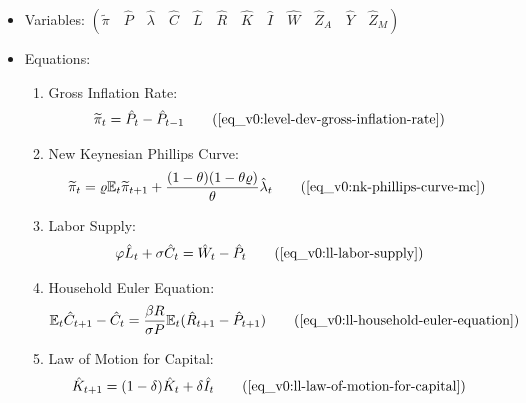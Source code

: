 \documentclass[../thesis.tex]{subfiles}
\begin{document}
	{\singlespacing
		
		\begin{itemize}
			
			\item Variables: \( \left( \tilde{\pi} \quad \hat{P} \quad \hat{\lambda} \quad \hat{C} \quad \hat{L} \quad \hat{R} \quad \hat{K} \quad \hat{I} \quad \hat{W} \quad \hat{Z}_A \quad \hat{Y} \quad \hat{Z}_M \right) \)
			
			\item Equations:
			
			\begin{enumerate}
				
				\item Gross Inflation Rate:
				\begin{align}
					\widetilde{\pi}_t &= \hat{P}_t - \hat{P}_{t-1}
					\tag{\ref{eq_v0:level-dev-gross-inflation-rate}}
				\end{align}
				
				\item New Keynesian Phillips Curve:
				\begin{align}
					\widetilde{\pi}_t = \varrho \E \widetilde{\pi}_{t+1} + \frac{(1-\theta) (1- \theta \varrho)}{\theta} \hat{\lambda}_t
					\tag{\ref{eq_v0:nk-phillips-curve-mc}}
				\end{align}
				
				\item Labor Supply:
				\begin{align}
					\varphi \hat{L}_t + \sigma \hat{C}_t &= \hat{W}_t - \hat{P}_t
					\tag{\ref{eq_v0:ll-labor-supply}}
				\end{align}
				
				\item Household Euler Equation:
				\begin{align}
					\E \hat{C}_{t+1} - \hat{C}_t &= \frac{\beta R}{\sigma P} \E(\hat{R}_{t+1} - \hat{P}_{t+1})
					\tag{\ref{eq_v0:ll-household-euler-equation}}
				\end{align}
				
				\item Law of Motion for Capital:
				\begin{align}
					\hat{K}_{t+1} &= (1-\delta)\hat{K}_t + \delta \hat{I}_t
					\tag{\ref{eq_v0:ll-law-of-motion-for-capital}}
				\end{align}
				
				

\end{enumerate}
\end{itemize}}
\end{document}
